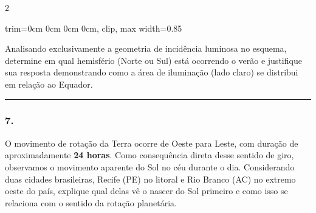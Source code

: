 \documentclass[twoside, 10pt, a4paper]{article}
\newlength{\espacoPreQuestao}\setlength{\espacoPreQuestao}{0.1cm}
\newlength{\espacoQuestao}\setlength{\espacoQuestao}{0.2cm}
\newcommand{\larguraTikz}{0.85\linewidth}
\begin{document}
\begin{multicols*}{2}
\begin{center}
\begin{adjustbox}{trim=0cm 0cm 0cm 0cm, clip, max width=\larguraTikz}
\end{adjustbox}
\end{center}

Analisando exclusivamente a geometria de incidência luminosa no esquema, determine em qual hemisfério (Norte ou Sul) está ocorrendo o verão e justifique sua resposta demonstrando como a área de iluminação (lado claro) se distribui em relação ao Equador.
\par\vspace{\espacoQuestao}

\noindent\textcolor{CorLinha}{\rule{\linewidth}{0.5pt}} 
\par\vspace{\espacoPreQuestao}
\subsubsection*{7.} O movimento de rotação da Terra ocorre de Oeste para Leste, com duração de aproximadamente \textbf{24 horas}. Como consequência direta desse sentido de giro, observamos o movimento aparente do Sol no céu durante o dia. Considerando duas cidades brasileiras, Recife (PE) no litoral e Rio Branco (AC) no extremo oeste do país, explique qual delas vê o nascer do Sol primeiro e como isso se relaciona com o sentido da rotação planetária.
\par\vspace{\espacoQuestao}


\end{multicols*}
\end{document}
